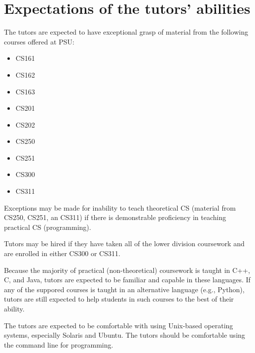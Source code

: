 \documentclass[12pt]{article}
\begin{document}
\section{Expectations of the tutors' abilities}
The tutors are expected to have exceptional grasp of material 
from the following courses offered at PSU:

	\begin{itemize}
	\item CS161
  \item CS162
  \item CS163
  \item CS201
  \item CS202
  \item CS250
  \item CS251
	\item CS300
	\item CS311
	\end{itemize}

Exceptions may be made for inability to teach theoretical CS 
(material from CS250, CS251, an CS311) if there is demonstrable 
proficiency in teaching practical	CS (programming). 

Tutors may be hired if they have taken all of the lower division 
coursework and are enrolled in either CS300 or CS311. 

Because the majority of practical (non-theoretical) coursework is 
taught in C++, C, and Java, tutors are expected to be familiar and 
capable in these languages. If any of the suppored courses is taught
in an alternative language (e.g., Python), tutors are still expected
to help students in such courses to the best of their ability. 

The tutors are expected to be comfortable with using Unix-based 
operating systems, especially Solaris and Ubuntu. The tutors should
be comfortable using the command line for programming.
\end{document}
